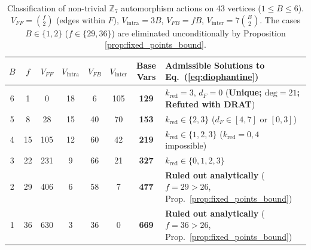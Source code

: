 \documentclass[11pt,a4paper]{article}
\theoremstyle{definition}
\begin{document}
\begin{table}[h!]
\centering
\small
\begin{tabular}{cccccccp{5.5cm}}
\toprule
$B$ & $f$ & $V_{FF}$ & $V_{\text{intra}}$ & $V_{FB}$ & $V_{\text{inter}}$ & \textbf{Base Vars} & \textbf{Admissible Solutions to Eq.~(\ref{eq:diophantine})} \\
\midrule
6 & 1  & 0   & 18 & 6  & 105 & \textbf{129} & $k_{\text{red}}=3$, $d_F=0$ (\textbf{Unique; $\text{deg}=21$; Refuted with DRAT}) \\
5 & 8  & 28  & 15 & 40 & 70  & \textbf{153} & $k_{\text{red}} \in \{2, 3\}$ ($d_F \in [4,7]$ or $[0,3]$) \\
4 & 15 & 105 & 12 & 60 & 42  & \textbf{219} & $k_{\text{red}} \in \{1, 2, 3\}$ ($k_{\text{red}}=0, 4$ impossible) \\
3 & 22 & 231 & 9  & 66 & 21  & \textbf{327} & $k_{\text{red}} \in \{0, 1, 2, 3\}$ \\
2 & 29 & 406 & 6  & 58 & 7   & \textbf{477} & \textbf{Ruled out analytically} ($f=29 > 26$, Prop.~\ref{prop:fixed_points_bound}) \\
1 & 36 & 630 & 3  & 36 & 0   & \textbf{669} & \textbf{Ruled out analytically} ($f=36 > 26$, Prop.~\ref{prop:fixed_points_bound}) \\
\bottomrule
\end{tabular}
\caption{Classification of non-trivial $\mathbb{Z}_7$ automorphism actions on 43 vertices ($1 \le B \le 6$). $V_{FF} = \binom{f}{2}$ (edges within $F$), $V_{\text{intra}} = 3B$, $V_{FB} = fB$, $V_{\text{inter}} = 7\binom{B}{2}$. The cases $B \in \{1, 2\}$ ($f \in \{29, 36\}$) are eliminated unconditionally by Proposition \ref{prop:fixed_points_bound}.}
\label{tab:fixed_points}
\end{table}
\end{document}

